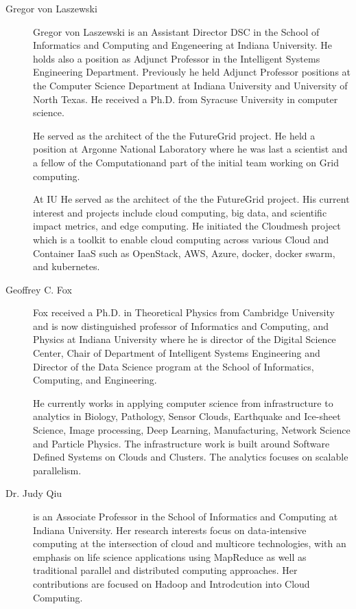 \FILENAME

\begin{description}

\item[Gregor von Laszewski]  Gregor von
  Laszewski is an Assistant Director DSC in the School of Informatics
  and Computing and Engeneering at Indiana University. He holds also a
  position as Adjunct Professor in the Intelligent Systems Engineering
  Department. Previously he held Adjunct Professor positions at the
  Computer Science Department at Indiana University and University of
  North Texas. He received a Ph.D. from Syracuse University in
  computer science.

  He served as the architect of the the FutureGrid project. He held a
  position at Argonne National Laboratory where he was last a
  scientist and a fellow of the Computationand part of the initial
  team working on Grid computing.

  At IU He served as the architect of the the FutureGrid project. His
  current interest and projects include cloud computing, big data, and
  scientific impact metrics, and edge computing.  He initiated the
  Cloudmesh project which is a toolkit to enable cloud computing
  across various Cloud and Container IaaS such as OpenStack, AWS,
  Azure, docker, docker swarm, and kubernetes.


\item[Geoffrey C. Fox]  Fox received a Ph.D. in
  Theoretical Physics from Cambridge University and is now
  distinguished professor of Informatics and Computing, and Physics at
  Indiana University where he is director of the Digital Science
  Center, Chair of Department of Intelligent Systems Engineering and
  Director of the Data Science program at the School of Informatics,
  Computing, and Engineering.

  He currently works in applying computer science from infrastructure
  to analytics in Biology, Pathology, Sensor Clouds, Earthquake and
  Ice-sheet Science, Image processing, Deep Learning, Manufacturing,
  Network Science and Particle Physics. The infrastructure work is
  built around Software Defined Systems on Clouds and Clusters. The
  analytics focuses on scalable parallelism.

\item [Dr. Judy Qiu] is an Associate Professor in the School of
  Informatics and Computing at Indiana University. Her research
  interests focus on data-intensive computing at the intersection of
  cloud and multicore technologies, with an emphasis on life science
  applications using MapReduce as well as traditional parallel and
  distributed computing approaches. Her contributions are focused on
  Hadoop and Introdcution into Cloud Computing. 

\end{description}

